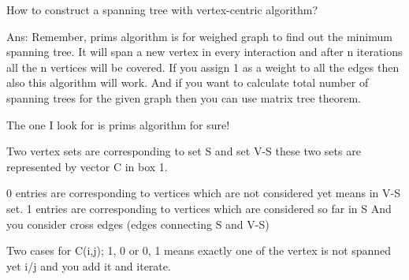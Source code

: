 How to construct a spanning tree with vertex-centric algorithm?

Ans: Remember, prims algorithm is for weighed graph to find out the minimum spanning tree.
It will span a new vertex in every interaction and after n iterations all the n vertices will be covered.
If you assign 1 as a weight to all the edges then also this algorithm will work. 
And if you want to calculate total number of spanning trees for the given graph then you can use matrix tree theorem.

The one I look for is prims algorithm for sure!
    
Two vertex sets are corresponding to set S and set V-S these two sets are represented by vector C in box 1.

0 entries are corresponding to vertices which are not considered yet means in V-S set.
1 entries are corresponding to vertices which are considered so far in S
And you consider cross edges (edges connecting S and V-S)
       
Two cases for C(i,j); 1, 0 or 0, 1 means exactly one of the vertex is not spanned yet i/j and you add it and iterate.
